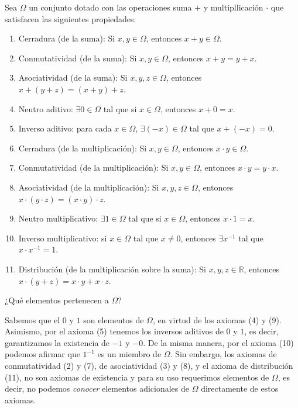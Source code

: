 \documentclass[11pt]{article}
\newcommand{\R}{\mathbb{R}}
\newcommand{\defined}{\coloneqq}
\let\set\Set
\begin{document}
Sea $\Omega$ un conjunto dotado con las operaciones suma $+$ y multipllicación $\cdot$ que satisfacen las siguientes propiedades:
\begin{enumerate}
\item Cerradura (de la suma): Si $x,y\in \Omega$, entonces $x+y\in \Omega$.
\item Conmutatividad (de la suma): Si $x,y\in \Omega$, entonces $x+y=y+x$.
\item Asociatividad (de la suma): Si $x,y,z \in \Omega$, entonces $x+(y+z)=(x+y)+z$.
\item Neutro aditivo: $\exists 0 \in \Omega$ tal que si $x\in \Omega$, entonces $x+0=x$.
\item Inverso aditivo: para cada $x\in \Omega$, $\exists (-x)\in \Omega$ tal que $x+(-x)=0$.
\item Cerradura (de la multiplicación): Si $x,y\in \Omega$, entonces $x\cdot y \in \Omega$.
\item Conmutatividad (de la multiplicación): Si $x,y\in \Omega$, entonces $x\cdot y = y\cdot x$.
\item Asociatividad (de la multiplicación): Si $x,y,z \in \Omega$, entonces $x\cdot (y\cdot z)=(x\cdot y)\cdot z$.
\item Neutro multiplicativo: $\exists 1\in \Omega$ tal que si $x\in \Omega$, entonces $x\cdot 1=x$.
\item Inverso multiplicativo: si $x\in \Omega$ tal que $x\neq 0$, entonces $\exists x^{-1}$ tal que $x\cdot x^{-1}=1$.
\item Distribución (de la multiplicación sobre la suma): Si $x,y,z\in \R$, entonces $x\cdot(y+z)=x\cdot y+x\cdot z$.
\end{enumerate}

¿Qué elementos pertenecen a $\Omega$?

Sabemos que el $0$ y $1$ son elementos de $\Omega$, en virtud de los axiomas (4) y (9). Asimismo, por el axioma (5) tenemos los inversos aditivos de $0$ y $1$, es decir, garantizamos la existencia de $-1$ y $-0$. De la misma manera, por el axioma (10) podemos afirmar que $1^{-1}$ es un miembro de $\Omega$. Sin embargo, los axiomas de conmutatividad (2) y (7), de asociatividad (3) y (8), y el axioma de distribución (11), no son axiomas de existencia y para su uso requerimos elementos de $\Omega$, es decir, no podemos \textit{conocer} elementos adicionales de $\Omega$ directamente de estos axiomas.
\end{document}
